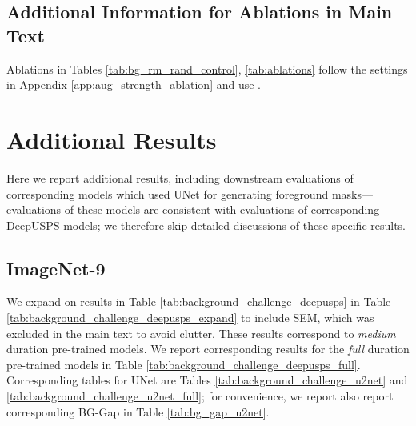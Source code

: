 \documentclass[twoside,11pt]{article}
\begin{document}
\subsection{Additional Information for Ablations in Main Text}

Ablations in Tables \ref{tab:bg_rm_rand_control}, \ref{tab:ablations} follow the settings in Appendix \ref{app:aug_strength_ablation} and use .


\section{Additional Results}
\label{app:add_results}

Here we report additional results, including downstream evaluations of corresponding models which used UNet for generating foreground masks---evaluations of these models are consistent with evaluations of corresponding DeepUSPS models; we therefore skip detailed discussions of these specific results. 

\subsection{ImageNet-9}
\label{app: expand_bg_challenge}
We expand on results in Table \ref{tab:background_challenge_deepusps} in Table \ref{tab:background_challenge_deepusps_expand} to include SEM, which was excluded in the main text to avoid clutter.  These results correspond to \textit{medium} duration pre-trained models. We report corresponding results for the \textit{full} duration pre-trained models in Table \ref{tab:background_challenge_deepusps_full}. Corresponding tables for UNet are Tables \ref{tab:background_challenge_u2net} and \ref{tab:background_challenge_u2net_full}; for convenience, we report also report corresponding BG-Gap in Table \ref{tab:bg_gap_u2net}.
\end{document}
